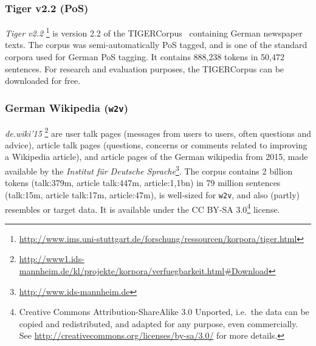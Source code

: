 \documentclass[11pt]{article}
\newcommand\wtv{\texttt{w2v}\xspace}
\begin{document}
\subsubsection{Tiger v2.2 (PoS)} %
\emph{Tiger v2.2}%
\footnote{\url{http://www.ims.uni-stuttgart.de/forschung/ressourcen/korpora/tiger.html}}
is version 2.2 of the TIGERCorpus~\cite{Brants2004} containing German newspaper
texts. 
The corpus was semi-automatically PoS tagged, and is one of the standard
corpora used for German PoS tagging. 
It contains 888,238 tokens in 50,472 sentences.
For research and evaluation purposes, the TIGERCorpus can be downloaded for
free.


\subsubsection{German Wikipedia (\wtv)} %
\emph{de.wiki'15}%
\footnote{\url{http://www1.ids-mannheim.de/kl/projekte/korpora/verfuegbarkeit.html#Download}}
are user talk pages (messages from users to users, often questions and advice),
article talk pages (questions, concerns or comments related to improving a
Wikipedia article), and article pages of the German wikipedia from 2015, made
available by the \emph{Institut f\"{u}r Deutsche
Sprache}\footnote{\url{http://www.ids-mannheim.de}}.
The corpus contains 2 billion tokens 
(talk:379m, article talk:447m, article:1,1bn) 
in 79 million sentences 
(talk:15m, article talk:17m, article:47m), is well-sized for \wtv, and
also (partly) resembles or target data.
It is available under the CC BY-SA 3.0\footnote{Creative Commons
Attribution-ShareAlike 3.0 Unported, i.e.~the data can be copied and
redistributed, and adapted for any purpose, even commercially. See
\url{http://creativecommons.org/licenses/by-sa/3.0/} for more details.}
license.
\end{document}
